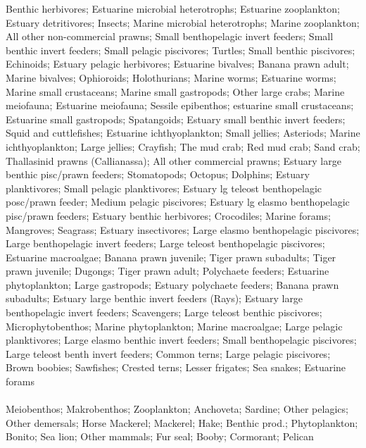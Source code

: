 Benthic herbivores; Estuarine microbial heterotrophs; Estuarine zooplankton; Estuary detritivores; Insects; Marine microbial heterotrophs; Marine zooplankton; All other non-commercial prawns; Small benthopelagic invert feeders; Small benthic invert feeders; Small pelagic piscivores; Turtles; Small benthic piscivores; Echinoids; Estuary  pelagic herbivores; Estuarine bivalves; Banana prawn adult; Marine bivalves; Ophioroids; Holothurians; Marine worms; Estuarine worms; Marine small crustaceans; Marine small gastropods; Other large crabs; Marine meiofauna; Estuarine meiofauna; Sessile epibenthos; estuarine small crustaceans; Estuarine small gastropods; Spatangoids; Estuary small benthic invert feeders; Squid and cuttlefishes; Estuarine ichthyoplankton; Small jellies; Asteriods; Marine ichthyoplankton; Large jellies; Crayfish; The mud crab; Red mud crab; Sand crab; Thallasinid prawns (Callianassa); All other commercial prawns; Estuary large benthic pisc/prawn feeders; Stomatopods; Octopus; Dolphins; Estuary planktivores; Small pelagic planktivores; Estuary lg teleost benthopelagic posc/prawn feeder; Medium pelagic piscivores; Estuary lg elasmo benthopelagic pisc/prawn feeders; Estuary benthic herbivores; Crocodiles; Marine forams; Mangroves; Seagrass; Estuary insectivores; Large elasmo benthopelagic piscivores; Large benthopelagic invert feeders; Large teleost benthopelagic piscivores; Estuarine macroalgae; Banana prawn juvenile; Tiger prawn subadults; Tiger prawn juvenile; Dugongs; Tiger prawn adult; Polychaete feeders; Estuarine phytoplankton; Large gastropods; Estuary polychaete feeders; Banana prawn subadults; Estuary large benthic invert feeders (Rays); Estuary large benthopelagic invert feeders; Scavengers; Large teleost benthic piscivores; Microphytobenthos; Marine phytoplankton; Marine macroalgae; Large pelagic planktivores; Large elasmo benthic invert feeders; Small benthopelagic piscivores; Large teleost benth invert feeders; Common terns; Large pelagic piscivores; Brown boobies; Sawfishes; Crested terns; Lesser frigates; Sea snakes; Estuarine forams\\
\fullhline
\hline
{} \\
\hline
Meiobenthos; Makrobenthos; Zooplankton; Anchoveta; Sardine; Other pelagics; Other demersals; Horse Mackerel; Mackerel; Hake; Benthic prod.; Phytoplankton; Bonito; Sea lion; Other mammals; Fur seal; Booby; Cormorant; Pelican\\
\fullhline
\hline
{} \\
